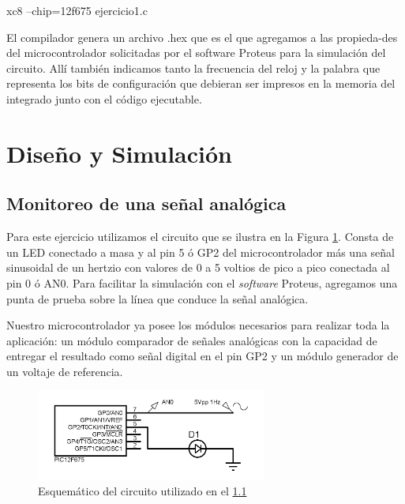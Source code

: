 \documentclass[a4paper]{article}
\newenvironment{ejercicios}
    {\setcounter{secnumdepth}{3}
    \renewcommand\thesubsection{Ejercicio \arabic{subsection}}}
    {\setcounter{secnumdepth}{0}}
\begin{document}
\begin{center}\ttfamily 
	xc8 --chip=12f675 ejercicio1.c
\end{center}

El compilador genera un archivo {\ttfamily .hex} que es el que
agregamos a las propieda-des del microcontrolador solicitadas 
por el software Proteus para la simulación del circuito. Allí también 
indicamos tanto la frecuencia del reloj y la palabra que representa 
los bits de configuración que debieran ser impresos en la memoria del
integrado junto con el código ejecutable. 

\section{Diseño y Simulación}

\begin{ejercicios}

    \subsection{Monitoreo de una señal analógica}\label{ej:monitoreo}

    Para este ejercicio utilizamos el circuito que se ilustra en la
    Figura \ref{fig:esquematico1}. Consta de un LED conectado a masa 
    y al pin 5 ó GP2 del microcontrolador más una señal sinusoidal de
    un hertzio con valores de 0 a 5 voltios de pico a pico 
    conectada al pin 0 ó AN0. Para facilitar la simulación con el 
    \textit{software} Proteus, agregamos una punta de prueba sobre la 
    línea que conduce la señal analógica.
    
    Nuestro microcontrolador ya posee los módulos necesarios para 
    realizar toda la aplicación: un módulo comparador de señales 
    analógicas con la capacidad de entregar el resultado como señal 
    digital en el pin GP2 y un módulo generador de un voltaje de 
    referencia.

    \begin{figure}[h]\centering
        \includegraphics[height=3cm]{esquematico1.png}
        \caption{Esquemático del circuito utilizado en el  
        \ref{ej:monitoreo}}\label{fig:esquematico1}
    \end{figure}


\end{ejercicios}
\end{document}
